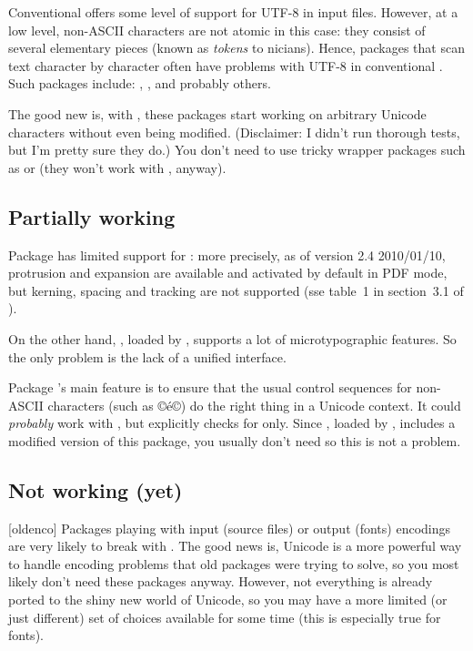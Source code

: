 \documentclass{lltxdoc}
\begin{document}
Conventional \latex offers some level of support for UTF-8 in input files.
However, at a low level, non-ASCII characters are not atomic in this case:
they consist of several elementary pieces (known as \emph{tokens} to
\tex{}nicians). Hence, packages that scan text character by character
often have problems with UTF-8 in conventional \latex. Such packages include:
, ,  and probably others.

The good new is, with \lualatex, these packages start working on arbitrary
Unicode characters without even being modified. (Disclaimer: I didn't run
thorough tests, but I'm pretty sure they do.) You don't need to use tricky
wrapper packages such as  or  (they won't work
with \luatex, anyway).

\subsection{Partially working}\label{partial}

Package  has limited support for \luatex: more precisely, as of
version 2.4 2010/01/10, protrusion and expansion are available and activated
by default in PDF mode, but kerning, spacing and tracking are not supported
(sse table~1 in section~3.1 of ).

On the other hand, , loaded by , supports a lot of
microtypographic features. So the only problem is the lack of a unified
interface.

Package 's main feature is to ensure that the usual control
sequences for non-ASCII characters (such as ©\'e©) do the right thing in a
Unicode context. It could \emph{probably} work with \luatex, but explicitly
checks for \xetex only. Since , loaded by , includes a
modified version of this package, you usually don't need  so this
is not a problem.

\subsection{Not working (yet)}\label{notworking}

[oldenco] Packages playing with input (source files) or
output (fonts) encodings are very likely to break with \luatex. The good news
is, Unicode is a more powerful way to handle encoding problems that old
packages were trying to solve, so you most likely don't need these packages
anyway. However, not everything is already ported to the shiny new world of
Unicode, so you may have a more limited (or just different) set of choices
available for some time (this is especially true for fonts).
\end{document}
